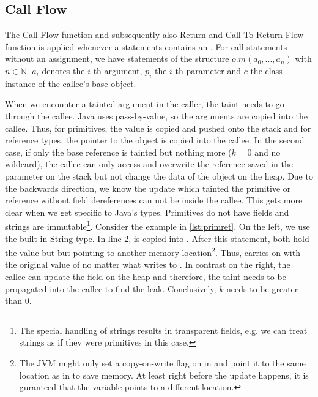 \documentclass[../draft.tex]{subfiles}
\begin{document}
    \subsection{Call Flow}
    The Call Flow function and subsequently also Return and Call To Return Flow function is applied whenever a statements contains an .
    For call statements without an assignment, we have statements of the structure $o.m(a_0, ..., a_n)$ with $n \in \mathbb{N}$. $a_i$ denotes the $i$-th argument, $p_i$ the $i$-th parameter and $c$ the class instance of the callee's base object.

    When we encounter a tainted argument in the caller, the taint needs to go through the callee. Java uses pass-by-value, so the arguments are copied into the callee. Thus, for primitives, the value is copied and pushed onto the stack and for reference types, the pointer to the object is copied into the callee. In the second case, if only the base reference is tainted but nothing more ($k=0$ and no wildcard), the callee can only access and overwrite the reference saved in the parameter on the stack but not change the data of the object on the heap. 
    Due to the backwards direction, we know the update which tainted the primitive or reference without field dereferences can not be inside the callee. This gets more clear when we get specific to Java's types. Primitives do not have fields and strings are immutable\footnote{The special handling of strings results in transparent fields, e.g. we can treat strings as if they were primitives in this case.}. Consider the example in \autoref{lst:primret}. On the left, we use the built-in String type. In line 2,  is copied into . After this statement, both  hold the value  but but pointing to another memory location\footnote{The JVM might only set a copy-on-write flag on  in  and point it to the same location as  in  to save memory. At least right before the update happens, it is guranteed that the variable points to a different location.}. Thus,  carries on with the original value of  no matter what  writes to . In contrast on the right, the callee can update the field on the heap and therefore, the taint needs to be propagated into the callee to find the leak. Conclusively, $k$ needs to be greater than $0$.
\end{document}
